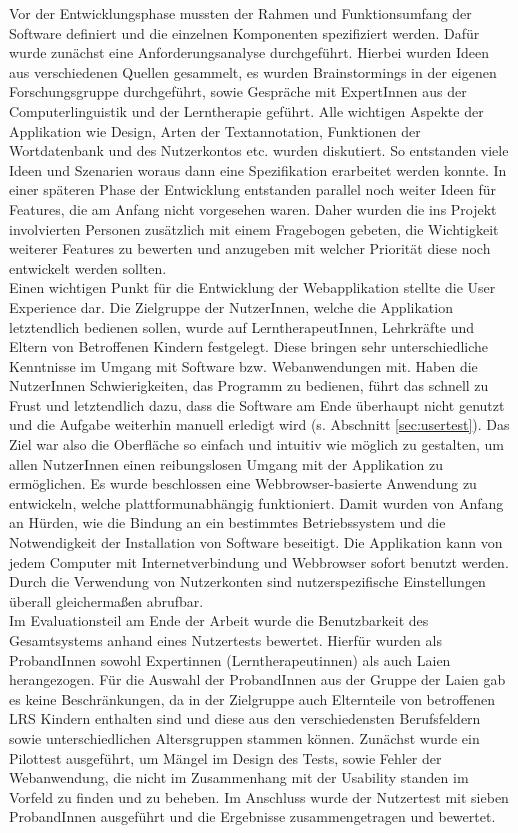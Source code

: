 Vor der Entwicklungsphase mussten der Rahmen und Funktionsumfang der Software definiert und die einzelnen Komponenten spezifiziert werden. Dafür wurde zunächst eine Anforderungsanalyse durchgeführt. Hierbei wurden Ideen aus verschiedenen Quellen gesammelt, es wurden Brainstormings in der eigenen Forschungsgruppe durchgeführt, sowie Gespräche mit ExpertInnen aus der Computerlinguistik und der Lerntherapie geführt. Alle wichtigen Aspekte der Applikation wie Design, Arten der Textannotation, Funktionen der Wortdatenbank und des Nutzerkontos etc. wurden diskutiert. So entstanden viele Ideen und Szenarien woraus dann eine Spezifikation erarbeitet werden konnte. In einer späteren Phase der Entwicklung entstanden parallel noch weiter Ideen für Features, die am Anfang nicht vorgesehen waren. Daher wurden die ins Projekt involvierten Personen zusätzlich mit einem Fragebogen gebeten, die Wichtigkeit weiterer Features zu bewerten und anzugeben mit welcher Priorität diese noch entwickelt werden sollten.\\
Einen wichtigen Punkt für die Entwicklung der Webapplikation stellte die User Experience dar. Die Zielgruppe der NutzerInnen, welche die Applikation letztendlich bedienen sollen, wurde auf LerntherapeutInnen, Lehrkräfte und Eltern von Betroffenen Kindern festgelegt. Diese bringen sehr unterschiedliche Kenntnisse im Umgang mit Software bzw. Webanwendungen mit. Haben die NutzerInnen Schwierigkeiten, das Programm zu bedienen, führt das schnell zu Frust und letztendlich dazu, dass die Software am Ende überhaupt nicht genutzt und die Aufgabe weiterhin manuell erledigt wird (s. Abschnitt \ref{sec:usertest}). Das Ziel war also die Oberfläche so einfach und intuitiv wie möglich zu gestalten, um allen NutzerInnen einen reibungslosen Umgang mit der Applikation zu ermöglichen. Es wurde beschlossen eine Webbrowser-basierte Anwendung zu entwickeln, welche plattformunabhängig funktioniert. Damit wurden von Anfang an Hürden, wie die Bindung an ein bestimmtes Betriebssystem und die Notwendigkeit der Installation von Software beseitigt. Die Applikation kann von jedem Computer mit Internetverbindung und Webbrowser sofort benutzt werden. Durch die Verwendung von Nutzerkonten sind nutzerspezifische Einstellungen überall gleichermaßen abrufbar.\\

Im Evaluationsteil am Ende der Arbeit wurde die Benutzbarkeit des Gesamtsystems anhand eines Nutzertests bewertet. Hierfür wurden als ProbandInnen sowohl Expertinnen (Lerntherapeutinnen) als auch Laien herangezogen. Für die Auswahl der ProbandInnen aus der Gruppe der Laien gab es keine Beschränkungen, da in der Zielgruppe auch Elternteile von betroffenen LRS Kindern enthalten sind und diese aus den verschiedensten Berufsfeldern sowie unterschiedlichen Altersgruppen stammen können. Zunächst wurde ein Pilottest ausgeführt, um Mängel im Design des Tests, sowie Fehler der Webanwendung, die nicht im Zusammenhang mit der Usability standen im Vorfeld zu finden und zu beheben. Im Anschluss wurde der Nutzertest mit sieben ProbandInnen ausgeführt und die Ergebnisse zusammengetragen und bewertet.\\

